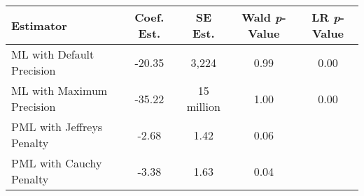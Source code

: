 
\begin{tabular}{lcccc}
\toprule
\textbf{Estimator} & \textbf{Coef. Est.} & \textbf{SE Est.} & \textbf{Wald \textit{p}-Value} & \textbf{LR \textit{p}-Value}\\
\midrule
ML with Default Precision & -20.35 & 3,224 & 0.99 & 0.00\\
ML with Maximum Precision & -35.22 & 15 million & 1.00 & 0.00\\
PML with Jeffreys Penalty & -2.68 & 1.42 & 0.06 & \\
PML with Cauchy Penalty & -3.38 & 1.63 & 0.04 & \\
\bottomrule
\end{tabular}